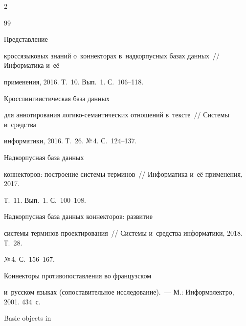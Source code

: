 \begin{multicols}{2}
   


  {\small\frenchspacing


 {%




 \begin{thebibliography}{99}


 


\vspace*{-3pt}







 Представление 


кроссязыковых знаний о~коннекторах в~надкорпусных базах данных~// Информатика и~её 


применения, 2016. Т.~10. Вып.~1. С.~106--118.




 Кросс\-линг\-ви\-сти\-че\-ская база данных 


для аннотирования ло\-ги\-ко-се\-ман\-ти\-че\-ских отношений в~тексте~// Сис\-те\-мы и~средства 


информатики, 2016. Т.~26. №\,4. С.~124--137.




 Надкорпусная база данных 


коннекторов: построение сис\-те\-мы терминов~// Информатика и~её применения, 2017. 


Т.~11. Вып.~1. С.~100--108.




 Надкорпусная база данных коннекторов: развитие 


системы терминов проектирования~// Системы и~средства информатики, 2018. Т.~28. 


№\,4. С.~156--167.




 Коннекторы противопоставления во французском 


и~русском языках (сопоставительное исследование).~--- М.: Информэлектро, 2001. 434~с. 




 Basic objects in 



\end{thebibliography}}}
\end{multicols}
